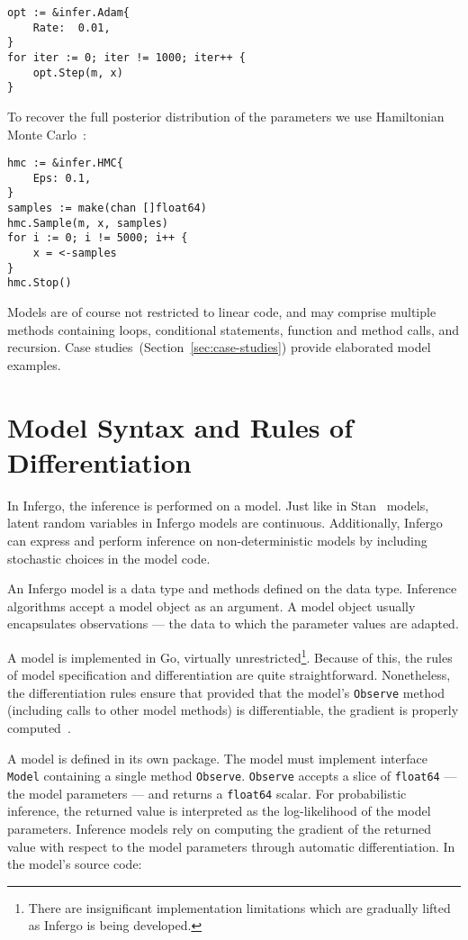 \documentclass[sigplan,review,10pt,anonymous]{acmart}
\begin{document}
\begin{sloppypar}
\begin{lstlisting}
opt := &infer.Adam{
    Rate:  0.01,
}
for iter := 0; iter != 1000; iter++ {
    opt.Step(m, x)
}
\end{lstlisting}

To recover the full posterior distribution of
the parameters we use Hamiltonian Monte Carlo~\cite{N12}:

\begin{lstlisting}
hmc := &infer.HMC{
	Eps: 0.1,
}
samples := make(chan []float64)
hmc.Sample(m, x, samples)
for i := 0; i != 5000; i++ {
	x = <-samples
}
hmc.Stop()
\end{lstlisting}

Models are of course not restricted to linear code, and may
comprise multiple methods containing loops, conditional
statements, function and method calls, and recursion. Case
studies~(Section~\ref{sec:case-studies}) provide elaborated
model examples.

\section{Model Syntax and Rules of Differentiation}

In Infergo, the inference is performed on a model. Just like in
Stan~\cite{Stan17} models, latent random variables in Infergo
models are continuous. Additionally, Infergo can express and
perform inference on non-deterministic models by including
stochastic choices in the model code.

An Infergo model is a data type and methods defined on the data
type.  Inference algorithms accept a model object as an
argument.  A model object usually encapsulates observations ---
the data to which the parameter values are adapted.

A model is implemented in Go, virtually
unrestricted\footnote{There are insignificant implementation
limitations which are gradually lifted as Infergo is being
developed.}. Because of this, the rules of model specification
and differentiation are quite straightforward. Nonetheless, the
differentiation rules ensure that provided that the model's
\lstinline{Observe} method (including calls to other model methods)
is differentiable, the gradient is properly computed~\cite{GW08}.

A model is defined in its own package. The model must
implement interface \lstinline{Model} containing a single method
\lstinline{Observe}. \lstinline{Observe} accepts a slice of
\lstinline{float64} --- the model parameters --- and returns a
\lstinline{float64} scalar. For probabilistic inference, the
returned value is interpreted as the log-likelihood of the model
parameters. Inference models rely on computing the gradient of
the returned value with respect to the model parameters through
automatic differentiation. In the model's source code:


\end{sloppypar}
\end{document}
